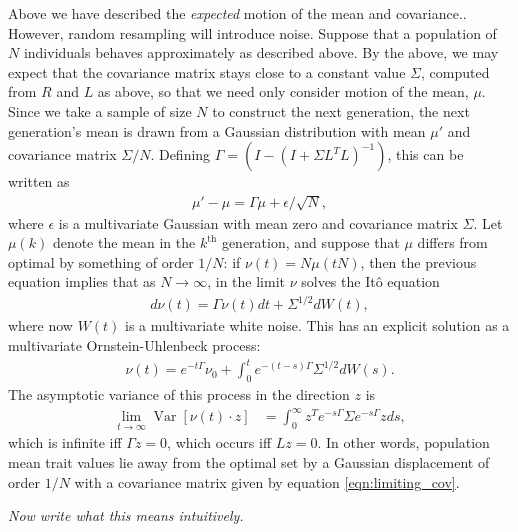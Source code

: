\documentclass{article}
\newcommand{\plr}[1]{\todo[color=blue!25]{#1}}
\newcommand{\plri}[1]{{\color{blue}\it #1}}
\newcommand{\plr}[1]{{\color{blue}\it #1}}
\newcommand{\plri}[1]{\plr{#1}}
\newcommand{\var}{\mathop{\mbox{Var}}}
\newcommand{\1}{\mathbbm{1}}
\begin{document}
Above we have described the \emph{expected} motion of the mean and covariance..
However, random resampling will introduce noise.
Suppose that a population of $N$ individuals
behaves approximately as described above.
By the above,
we may expect that the covariance matrix stays close to a constant value $\Sigma$,
computed from $R$ and $L$ as above,
so that we need only consider motion of the mean, $\mu$.
Since we take a sample of size $N$ to construct the next generation,
the next generation's mean is drawn from a Gaussian distribution with mean $\mu'$
and covariance matrix $\Sigma/N$.
Defining $\Gamma = (I - (I + \Sigma L^T L)^{-1})$,
this can be written as
\begin{align*}
    \mu' - \mu = \Gamma \mu + \epsilon/\sqrt{N} ,
\end{align*}
where $\epsilon$ is a multivariate Gaussian with mean zero and covariance matrix $\Sigma$.
Let $\mu(k)$ denote the mean in the $k^\text{th}$ generation,
and suppose that $\mu$ differs from optimal by something of order $1/N$:
if $\nu(t) = N \mu(tN)$,
then the previous equation implies that as $N \to \infty$, 
in the limit $\nu$ solves the It\^{o} equation
\begin{align*}
    d \nu(t) = \Gamma \nu(t) dt + \Sigma^{1/2} dW(t) ,
\end{align*}
where now $W(t)$ is a multivariate white noise.
This has an explicit solution as a multivariate Ornstein-Uhlenbeck process:
\begin{align*}
    \nu(t) = e^{-t \Gamma} \nu_0 + \int_0^t e^{-(t-s) \Gamma} \Sigma^{1/2} dW(s).
\end{align*}
The asymptotic variance of this process in the direction $z$ is
\begin{align} \label{eqn:limiting_cov}
    \lim_{t \to \infty} \var[\nu(t) \cdot z]
    &=
    \int_0^\infty z^T e^{-s \Gamma} \Sigma e^{-s \Gamma} z ds ,
\end{align}
which is infinite iff $\Gamma z = 0$,
which occurs iff $Lz=0$.
In other words, population mean trait values lie away from the optimal set
by a Gaussian displacement of order $1/N$
with a covariance matrix given by equation \eqref{eqn:limiting_cov}.

\plri{Now write what this means intuitively.}
\end{document}

